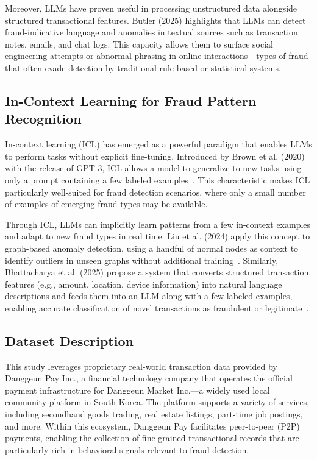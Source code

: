 \documentclass[sigconf]{acmart}
\begin{document}
Moreover, LLMs have proven useful in processing unstructured data alongside structured transactional features. Butler (2025) highlights that LLMs can detect fraud-indicative language and anomalies in textual sources such as transaction notes, emails, and chat logs. This capacity allows them to surface social engineering attempts or abnormal phrasing in online interactions—types of fraud that often evade detection by traditional rule-based or statistical systems.


\subsection{In-Context Learning for Fraud Pattern Recognition}
In-context learning (ICL) has emerged as a powerful paradigm that enables LLMs to perform tasks without explicit fine-tuning. Introduced by Brown et al. (2020) with the release of GPT-3, ICL allows a model to generalize to new tasks using only a prompt containing a few labeled examples~\cite{brown2020llm_fewshot}. This characteristic makes ICL particularly well-suited for fraud detection scenarios, where only a small number of examples of emerging fraud types may be available.

Through ICL, LLMs can implicitly learn patterns from a few in-context examples and adapt to new fraud types in real time. Liu et al. (2024) apply this concept to graph-based anomaly detection, using a handful of normal nodes as context to identify outliers in unseen graphs without additional training~\cite{liu2024anomaly}. Similarly, Bhattacharya et al. (2025) propose a system that converts structured transaction features (e.g., amount, location, device information) into natural language descriptions and feeds them into an LLM along with a few labeled examples, enabling accurate classification of novel transactions as fraudulent or legitimate~\cite{bhattacharya2024fraud}.



\subsection{Dataset Description}
This study leverages proprietary real-world transaction data provided by Danggeun Pay Inc., a financial technology company that operates the official payment infrastructure for Danggeun Market Inc.—a widely used local community platform in South Korea. The platform supports a variety of services, including secondhand goods trading, real estate listings, part-time job postings, and more. Within this ecosystem, Danggeun Pay facilitates peer-to-peer (P2P) payments, enabling the collection of fine-grained transactional records that are particularly rich in behavioral signals relevant to fraud detection.
\end{document}
